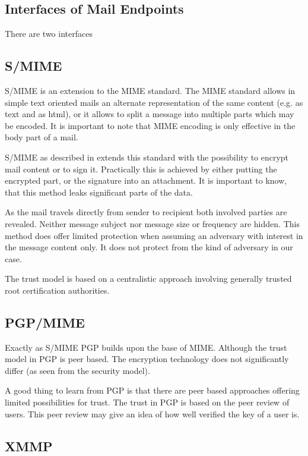 \subsection{Interfaces of Mail Endpoints}
There are two interfaces 


\subsection{S/MIME}
S/MIME is an extension to the MIME standard. The MIME standard allows in simple text oriented mails an alternate representation of the same content (e.g. as text and as html), or it allows to split a message into multiple parts which may be encoded. It is important to note that MIME encoding is only effective in the body part of a mail.

S/MIME as described in \cite{RFC3851} extends this standard with the possibility to encrypt mail content or to sign it. Practically this is achieved by either putting the encrypted part, or the signature into an attachment. It is important to know, that this method leaks significant parts of the data.

As the mail travels directly from sender to recipient both involved parties are revealed. Neither message subject nor message size or frequency are hidden. This method does offer limited protection when assuming an adversary with interest in the message content only. It does not protect from the kind of adversary in our case. 

The trust model is based on a centralistic approach involving generally trusted root certification authorities.

\subsection{PGP/MIME}
Exactly as S/MIME PGP\cite{RFC2440} builds upon the base of MIME. Although the trust model in PGP is peer based. The encryption technology does not significantly differ (as seen from the security model).

A good thing to learn from PGP is that there are peer based approaches offering limited possibilities for trust. The trust in PGP is based on the peer review of users. This peer review may give an idea of how well verified the key of a user is.


\subsection{XMMP}

